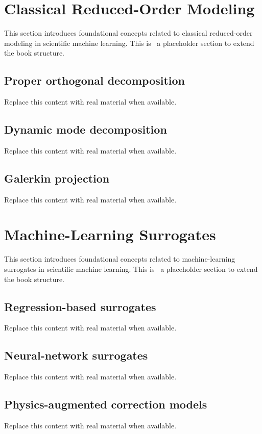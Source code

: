 
\section{Classical Reduced-Order Modeling}
This section introduces foundational concepts related to classical reduced-order modeling in scientific machine learning. This is~\cite{abdulmaksoudTransformerBasedSensorFusion2025} a placeholder section to extend the book structure.

\subsection{Proper orthogonal decomposition}
Replace this content with real material when available.

\subsection{Dynamic mode decomposition}
Replace this content with real material when available.

\subsection{Galerkin projection}
Replace this content with real material when available.

\section{Machine-Learning Surrogates}
This section introduces foundational concepts related to machine-learning surrogates in scientific machine learning. This is~\cite{abdulmaksoudTransformerBasedSensorFusion2025} a placeholder section to extend the book structure.

\subsection{Regression-based surrogates}
Replace this content with real material when available.

\subsection{Neural-network surrogates}
Replace this content with real material when available.

\subsection{Physics-augmented correction models}
Replace this content with real material when available.

